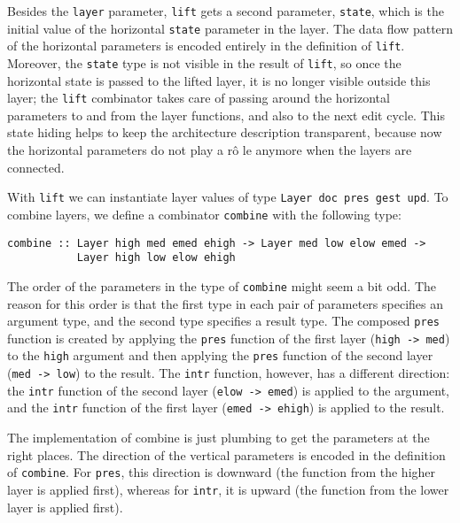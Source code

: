 Besides the \texttt{layer} parameter, \texttt{lift} gets a second parameter, \texttt{state}, which is the initial value of the horizontal \texttt{state} parameter in the layer. The data flow pattern of the horizontal parameters is encoded entirely in the definition of \texttt{lift}. Moreover, the \texttt{state} type is not visible in the result of \texttt{lift}, so once the horizontal state is passed to the lifted layer, it is no longer visible outside this layer; the \texttt{lift} combinator takes care of passing around the horizontal parameters to and from the layer functions, and also to the next edit cycle. This state hiding helps to keep the architecture description transparent, because now the horizontal parameters do not play a r\^o le anymore when the layers are connected.


With \texttt{lift} we can instantiate layer values of type \texttt{Layer doc pres gest upd}. To combine layers, we define a combinator \texttt{combine} with the following type:

\begin{small}
\begin{verbatim}
combine :: Layer high med emed ehigh -> Layer med low elow emed -> 
           Layer high low elow ehigh
\end{verbatim}
\end{small}

The order of the parameters in the type of \texttt{combine} might seem a bit odd. The reason for this order is that the first type in each pair of parameters specifies an argument type, and the second type specifies a result type. The composed \texttt{pres} function is created by applying the \texttt{pres} function of the first layer (\texttt{high -> med}) to the \texttt{high} argument and then applying the \texttt{pres} function of the second layer (\texttt{med -> low}) to the result. The \texttt{intr} function, however, has a different direction: the \texttt{intr} function of the second layer (\texttt{elow -> emed}) is applied to the argument, and the \texttt{intr} function of the first layer (\texttt{emed -> ehigh}) is applied to the result.

The implementation of combine is just plumbing to get the parameters at the right places. The direction of the vertical parameters is encoded in the definition of \texttt{combine}. For \texttt{pres}, this direction is downward (the function from the higher layer is applied first), whereas for \texttt{intr}, it is upward (the function from the lower layer is applied first).

